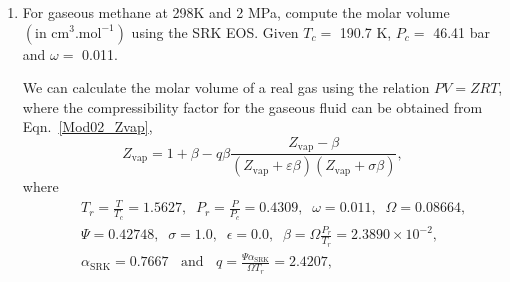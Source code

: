 \documentclass[12pts,a4paper,amsmath,amssymb,floatfix]{article}%
\newcommand{\frc}{\displaystyle\frac}
\begin{document}
\begin{enumerate}[1)]
\item\label{Mod02Ex01} For gaseous methane at 298K and 2 MPa, compute the molar volume $\left(\text{in cm}^{3}.\text{mol}^{-1}\right)$ using the SRK EOS. Given $T_{c}=$ 190.7 K, $P_{c}=$ 46.41 bar and $\omega=$ 0.011.

         We can calculate the molar volume of a real gas using the relation $PV=ZRT$, where the compressibility factor for the gaseous fluid can be obtained from Eqn.~\ref{Mod02_Zvap},
           \begin{displaymath}
                Z_{\text{vap}} = 1 + \beta - q\beta \frc{Z_{\text{vap}} - \beta} {\left(Z_{\text{vap}}+\varepsilon\beta\right)\left(Z_{\text{vap}} +\sigma\beta\right)},
           \end{displaymath}
           where 
           \begin{eqnarray}
               && T_{r}=\frc{T}{T_{c}} = 1.5627,\;\;P_{r}=\frc{P}{P_{c}}=0.4309,\;\;\omega=0.011,\;\;\Omega = 0.08664, \nonumber \\
               && \Psi = 0.42748,\;\; \sigma=1.0,\;\;\epsilon=0.0,\;\;\beta=\Omega\frc{P_{r}}{T_{r}}=2.3890\times 10^{-2},\nonumber \\
               && \alpha_{\text{SRK}} = 0.7667\;\;\text{ and }\;\; q = \frc{\Psi\alpha_{\text{SRK}}}{\Omega T_{r}} = 2.4207, \nonumber 
           \end{eqnarray}


\end{enumerate}
\end{document}

